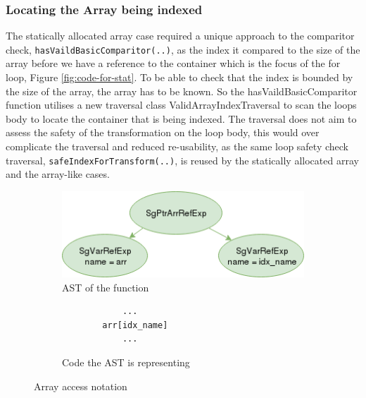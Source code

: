 \documentclass[bsc,frontabs,singlespacing,parskip,deptreport]{infthesis}
\begin{document}
\subsubsection{Locating the Array being indexed}

The statically allocated array case required a unique approach to the comparitor check, \texttt{hasVaildBasicComparitor(..)}, as the index it compared to the size of the array before we have a reference to the container which is the focus of the for loop, Figure \ref{fig:code-for-stat}. To be able to check that the index is bounded by the size of the array, the array has to be known. So the hasVaildBasicComparitor function utilises a new traversal class ValidArrayIndexTraversal to scan the loops body to locate the container that is being indexed. The traversal does not aim to assess the safety of the transformation on the loop body, this would over complicate the traversal and reduced re-usability, as the same loop safety check traversal, \texttt{safeIndexForTransform(..)}, is reused by the statically allocated array and the array-like cases. 

\begin{figure}[H]
    \begin{subfigure}[b]{0.6\textwidth}
        \centering
        \includegraphics[width=1\textwidth]{images/ArrPtrAcc.png}
        \caption{AST of the function}
        \label{fig:arr-acc-AST}
    \end{subfigure}
    \hfill
    \begin{subfigure}[b]{0.4\textwidth}
        \centering
        \begin{verbatim}
            ...
        arr[idx_name]
            ...
        \end{verbatim}
        \caption{Code the AST is representing}
        \label{fig:arr-acc-code}
    \end{subfigure}
    \vspace{-0.5cm}
    \caption{Array access notation}
    \label{fig:arr-access}
\end{figure}
\end{document}
